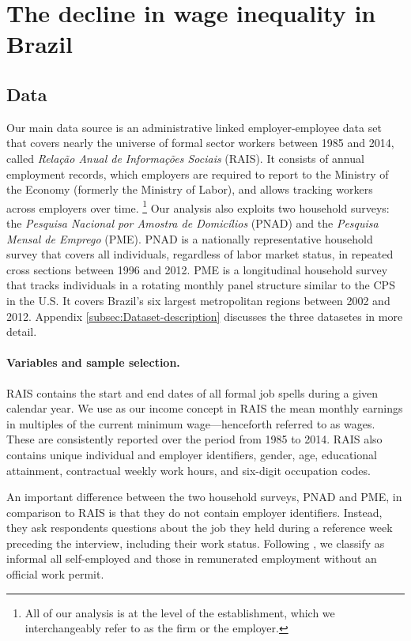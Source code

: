 
\section{The decline in wage inequality in Brazil\label{SECTION: Data}}

\subsection{Data}

Our main data source is an administrative linked employer-employee data set that covers nearly the universe of formal sector workers between 1985 and 2014, called \emph{Rela{\c{c}}{\~{a}}o Anual de Informa{\c{c}}{\~{o}}es Sociais} (RAIS). It consists of annual employment records, which employers are required to report to the Ministry of the Economy (formerly the Ministry of Labor), and allows tracking workers across employers over time.%
%
\footnote{All of our analysis is at the level of the establishment, which we interchangeably refer to as the firm or the employer.} %
%
Our analysis also exploits two household surveys: the \emph{Pesquisa Nacional por Amostra de Domic{\'{i}}lios} (PNAD) and the \emph{Pesquisa Mensal de Emprego} (PME). PNAD is a nationally representative household survey that covers all individuals, regardless of labor market status, in repeated cross sections between 1996 and 2012. PME is a longitudinal household survey that tracks individuals in a rotating monthly panel structure similar to the CPS in the U.S. It covers Brazil's six largest metropolitan regions between 2002 and 2012. Appendix \ref{subsec:Dataset-description} discusses the three datasetes in more detail.

\paragraph{Variables and sample selection.}

RAIS contains the start and end dates of all formal job spells during a given calendar year. We use as our income concept in RAIS the mean monthly earnings in multiples of the current minimum wage---henceforth referred to as wages. These are consistently reported over the period from 1985 to 2014. RAIS also contains unique individual and employer identifiers, gender, age, educational attainment, contractual weekly work hours, and six-digit occupation codes.%

An important difference between the two household surveys, PNAD and PME, in comparison to RAIS is that they do not contain employer identifiers. Instead, they ask respondents questions about the job they held during a reference week preceding the interview, including their work status. Following \citet{MeghirNarita2015}, we classify as informal all self-employed and those in remunerated employment without an official work permit.

